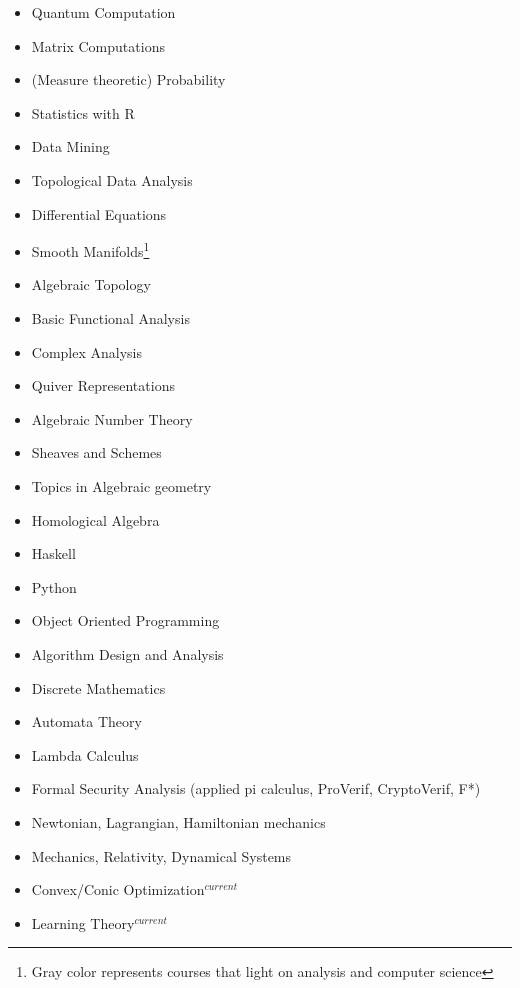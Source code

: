 \begin{multicols}{3}
\begin{itemize}
\setlength\itemsep{-0.5em}
\item Quantum Computation
\item Matrix Computations
\item (Measure theoretic) Probability
\item Statistics with R
\item Data Mining
\item Topological Data Analysis
\item Differential Equations
\item {\color{gray}Smooth Manifolds}\footnote{Gray color represents courses that light on analysis and computer science}
\item {\color{gray}Algebraic Topology}
\item Basic Functional Analysis
\item Complex Analysis
\item {\color{gray}Quiver Representations}
\item {\color{gray}Algebraic Number Theory}
\item {\color{gray}Sheaves and Schemes}
\item {\color{gray}Topics in Algebraic geometry}
\item {\color{gray}Homological Algebra}
\item Haskell
\item Python
\item Object Oriented Programming
\item Algorithm Design and Analysis
\item Discrete Mathematics
\item Automata Theory
\item Lambda Calculus
\item Formal Security Analysis (applied pi calculus, ProVerif, CryptoVerif, F*)
\item Newtonian, Lagrangian, Hamiltonian mechanics
\item Mechanics, Relativity, Dynamical Systems
\item Convex/Conic Optimization$^{current}$
\item Learning Theory$^{current}$
\end{itemize}
\end{multicols}





